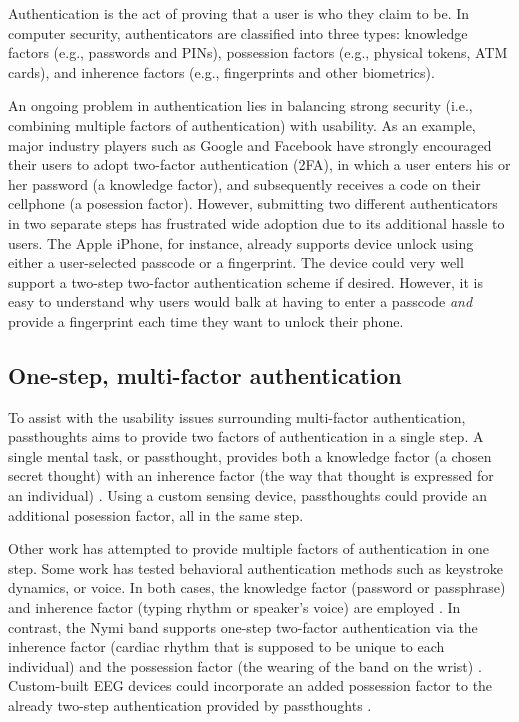 \documentclass[sigconf]{acmart}
\begin{document}
Authentication is the act of proving that a user is who they claim to be.
In computer security, authenticators are classified into three types: knowledge factors (e.g., passwords
and PINs), possession factors (e.g., physical tokens, ATM cards), and inherence
factors (e.g., fingerprints and other biometrics). 

An ongoing problem in authentication lies in balancing strong security
(i.e., combining multiple factors of authentication)
with usability.
As an example, major industry players such as Google and
Facebook have strongly encouraged their users to adopt two-factor
authentication (2FA), in which a user enters his or her password (a knowledge factor),
and subsequently receives a code on their cellphone (a posession factor).
However, submitting two different 
authenticators in two separate steps has frustrated wide adoption
due to its additional hassle to users. The Apple iPhone, for instance,
already supports device unlock using either a user-selected passcode or a fingerprint. The
device could very well support a two-step two-factor authentication scheme if
desired. However, it is easy to understand why users would balk at having to
enter a passcode \emph{and} provide a fingerprint each time they want to unlock their phone.

\subsection{One-step, multi-factor authentication}
\label{sec:org416ad55}

To assist with the usability issues surrounding multi-factor authentication,
passthoughts aims to provide two factors of authentication in a single step.
A single mental task, or passthought, provides both a knowledge factor (a chosen secret thought)
with an inherence factor (the way that thought is expressed for an individual) \cite{Chuang2013b,Johnson2014}.
Using a custom sensing device, passthoughts could provide an additional posession factor, all in the same step.

Other work has attempted to provide multiple factors of authentication in one step.
Some work has tested behavioral authentication methods such as keystroke dynamics, or voice. In both cases, the knowledge factor (password or passphrase) and
inherence factor (typing rhythm or speaker's voice) are employed \cite{Monrose1997}.
In contrast, the Nymi band supports one-step two-factor authentication via the inherence
factor (cardiac rhythm that is supposed to be unique to each individual) and the
possession factor (the wearing of the band on the wrist) \cite{Nymi}.
Custom-built EEG devices could incorporate an added possession factor 
to the already two-step authentication provided by passthoughts \cite{Curran2017}.
\end{document}
